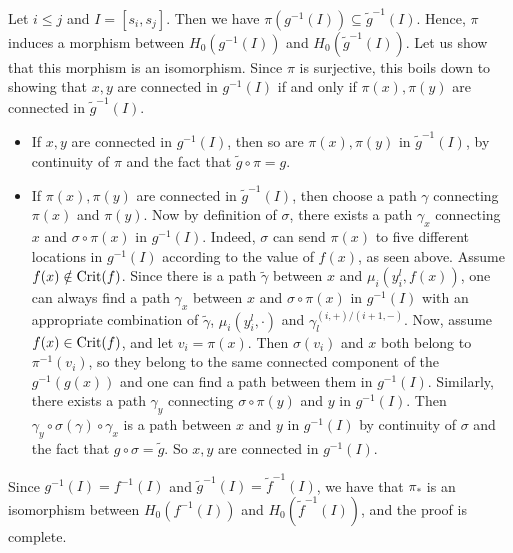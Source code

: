 Let $i\leq j$ and $I=[s_i,s_j]$.
Then we have $\pi(g^{-1}(I))\subseteq \tilde g^{-1} (I)$. 
Hence, $\pi$ induces a morphism between $H_0(g^{-1}(I))$ and $H_0(\tilde g^{-1}(I))$. 
Let us show that this morphism is an isomorphism. Since $\pi$ is surjective, this boils down to
showing that $x,y$ are connected in $g^{-1}(I)$ if and only if $\pi(x),\pi(y)$ are connected in $\tilde g^{-1}(I)$.
%
\begin{itemize}
\item If $x,y$ are connected in $g^{-1}(I)$, then so are $\pi(x),\pi(y)$ in $\tilde g^{-1}(I)$, by
  continuity of $\pi$ and the fact that $\tilde{g}\circ\pi=g$.
%
\item If $\pi(x),\pi(y)$ are connected in $\tilde g^{-1}(I)$, then choose a path $\gamma$
  connecting $\pi(x)$ and $\pi(y)$. Now by definition of $\sigma$,
  there exists a path $\gamma_x$ connecting $x$ and
  $\sigma\circ\pi(x)$ in $g^{-1}(I)$.  Indeed, $\sigma$ can send
  $\pi(x)$ to five different locations in $g^{-1}(I)$
  according to the value of $f(x)$, as seen above.  
  Assume $f(x)\notin \mathrm{Crit}(f)$. Since there is a path $\tilde \gamma$ between
  $x$ and $\mu_i(y_i^l,f(x))$, one can always find a path $\gamma_x$
  between $x$ and $\sigma\circ\pi(x)$ in $g^{-1}(I)$ with an
  appropriate combination of $\tilde \gamma$, $\mu_i(y_i^l,\cdot)$ and
  $\gamma_l^{(i,+)/(i+1,-)}$.  
  Now, assume $f(x)\in\mathrm{Crit}(f)$, and let $v_i=\pi(x)$. Then $\sigma(v_i)$ and $x$
  both belong to $\pi^{-1}(v_i)$, so they belong to the same connected component of 
  the $g^{-1}(g(x))$ and one can find a path between them in $g^{-1}(I)$.
  Similarly, there exists a path $\gamma_y$
  connecting $\sigma\circ\pi(y)$ and $y$ in $g^{-1}(I)$. Then
  $\gamma_y\circ\sigma(\gamma)\circ\gamma_x$ is a path
  between $x$ and $y$ in $g^{-1}(I)$
  by continuity of $\sigma$ and the fact that $g\circ\sigma=\tilde{g}$.
  So $x,y$ are connected in $g^{-1}(I)$.
\end{itemize}
%
Since $g^{-1}(I)=f^{-1}(I)$ and $\tilde g^{-1}(I)= \tilde f^{-1}(I)$, we have that 
$\pi_*$ is an isomorphism between $H_0(f^{-1}(I))$ and $H_0(\tilde f^{-1}(I))$, and the proof is complete. 

